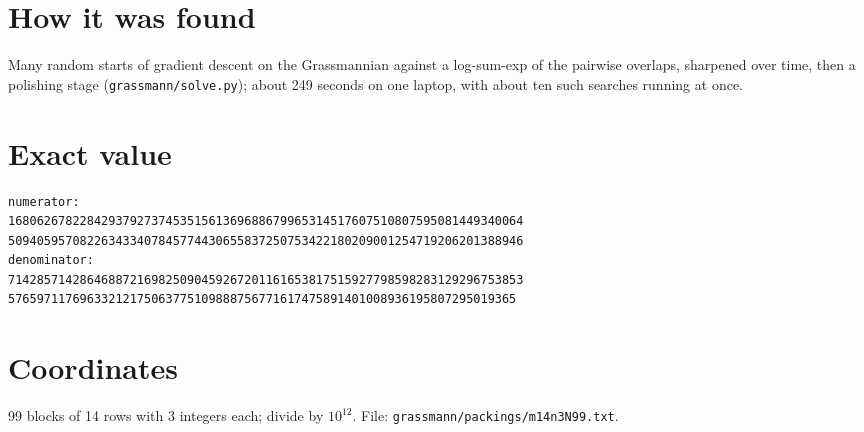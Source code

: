 \documentclass[11pt,a4paper]{article}
\begin{document}
\section{How it was found}
Many random starts of gradient descent on the Grassmannian against a log-sum-exp of the pairwise overlaps, sharpened over time, then a polishing stage (\texttt{grassmann/solve.py}); about 249 seconds on one laptop, with about ten such searches running at once.


\appendix
\section{Exact value}
{\small
\begin{verbatim}
numerator:
168062678228429379273745351561369688679965314517607510807595081449340064
509405957082263433407845774430655837250753422180209001254719206201388946
denominator:
714285714286468872169825090459267201161653817515927798598283129296753853
57659711769633212175063775109888756771617475891401008936195807295019365
\end{verbatim}}

\section{Coordinates}
99 blocks of 14 rows with 3 integers each; divide by $10^{12}$. File: \texttt{grassmann/packings/m14n3N99.txt}.
{\tiny
\begin{multicols}{3}
\end{multicols}}
\end{document}
